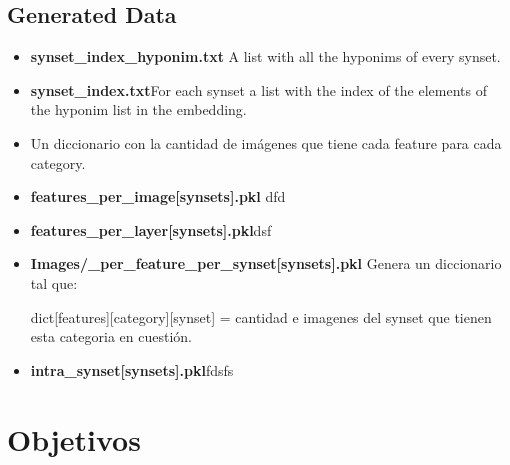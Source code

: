 \documentclass{article}
\begin{document}
\subsection{Generated Data}
\begin{itemize}
\item \textbf{synset\_index\_hyponim.txt} A list with all the hyponims of every synset.


\item \textbf{synset\_index.txt}For each synset a list with the index of the elements of the hyponim list in the embedding.


\item Un diccionario con la cantidad de imágenes que tiene cada feature para cada category. 
\item \textbf{features\_per\_image[synsets].pkl} dfd
\item \textbf{features\_per\_layer[synsets].pkl}dsf
\item \textbf{Images/\_per\_feature\_per\_synset[synsets].pkl} Genera un diccionario tal que:

dict[features][category][synset] = cantidad e imagenes del synset que tienen esta categoria en cuestión.
\item \textbf{intra\_synset[synsets].pkl}fdsfs
\end{itemize}

\section{Objetivos}
\end{document}

